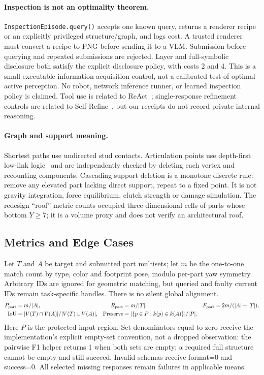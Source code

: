 \paragraph{Inspection is not an optimality theorem.}
\texttt{InspectionEpisode.query()} accepts one known query, returns a renderer recipe
or an explicitly privileged structure/graph, and logs cost. A trusted renderer must
convert a recipe to PNG before sending it to a VLM. Submission before querying and
repeated submissions are rejected. Layer and full-symbolic disclosure both satisfy
the explicit disclosure policy, with costs 2 and 4. This is a small executable
information-acquisition control, not a calibrated test of optimal active perception.
No robot, network inference runner, or learned inspection policy is claimed.
Tool use is related to ReAct~\cite{yao2023react}; single-response refinement controls
are related to Self-Refine~\cite{madaan2023selfrefine}, but our receipts do not record
private internal reasoning.

\paragraph{Graph and support meaning.}
Shortest paths use undirected stud contacts. Articulation points use depth-first
low-link logic~\cite{tarjan1972} and are independently checked by deleting each vertex
and recounting components. Cascading support deletion is a monotone discrete rule:
remove any elevated part lacking direct support, repeat to a fixed point.
It is not gravity integration, force equilibrium, clutch strength or damage simulation.
The redesign ``roof'' metric counts occupied three-dimensional cells of parts whose
bottom $Y\geq7$; it is a volume proxy and does not verify an architectural roof.

\subsection{Metrics and Edge Cases}
Let $T$ and $A$ be target and submitted part multisets; let $m$ be the one-to-one
match count by type, color and footprint pose, modulo per-part yaw symmetry.
Arbitrary IDs are ignored for geometric matching, but queried and faulty current IDs
remain task-specific handles. There is no silent global alignment.
\begin{align}
P_{\rm part}&=m/|A|,&R_{\rm part}&=m/|T|,&F_{\rm part}&=2m/(|A|+|T|),\\
{\rm IoU}&=|V(T)\cap V(A)|/|V(T)\cup V(A)|,&
{\rm Preserve}&=|\{p\in P:k(p)\in k(A)\}|/|P|.
\end{align}
Here $P$ is the protected input region. Set denominators equal to zero receive the
implementation's explicit empty-set convention, not a dropped observation:
the pairwise F1 helper returns 1 when both sets are empty; a required full structure
cannot be empty and still succeed. Invalid schemas receive format=0 and success=0.
All selected missing responses remain failures in applicable means.

